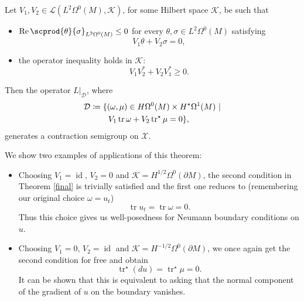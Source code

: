 \documentclass{ifacconf}
\newcommand{\tr}{\operatorname{tr}}
\newcommand{\Real}{\operatorname{Re}}
\newcommand{\drh}[2]{\Omega^{#2}(#1)}
\begin{document}
\begin{thm}\label{final}
    Let $V_1,V_2\in\mathcal{L}(L^2\drh{M}{0},\mathcal{K})$, for some Hilbert space $\mathcal{K}$, be such that
    \begin{itemize}
        \item $\Real\scprod{\theta}{\sigma}_{L^2\drh{M}{0}}\leq 0$ for every $\theta,\sigma\in L^2\drh{M}{0}$ satisfying
        \[
            V_1\theta+V_2\sigma=0,
        \]
        \item the operator inequality holds in $\mathcal{K}$:
        \[ 
            V_1V_2^*+V_2V_1^*\geq0.
        \]
    \end{itemize}
    Then the operator $L|_{\mathcal{D}}$, where
    \begin{align*}
        \MoveEqLeft
        \mathcal{D}\coloneqq \{ (\omega,\mu)\in H\drh{M}{0}\times H^{\star}\drh{M}{1}\ |\\
        &\quad  V_1\tr\omega+V_2\tr^{\star}\mu =0\},
    \end{align*}
    generates a contraction semigroup on $\mathcal{X}$.
\end{thm}
We show two examples of applications of this theorem:
\begin{itemize}
    \item Choosing $V_1=\operatorname{id}$, $V_2=0$ and $\mathcal{K}=H^{1/2}\drh{\partial M}{0}$, the second condition in Theorem \ref{final} is trivially satisfied and the first one reduces to (remembering our original choice $\omega=u_t$)
    \[
        \tr u_t=\tr\omega=0.
    \]
    Thus this choice gives us well-posedness for Neumann boundary conditions on $u$.
    \item Choosing $V_1=0$, $V_2=\operatorname{id}$ and $\mathcal{K}=H^{-1/2}\drh{\partial M}{0}$, we once again get the second condition for free and obtain
    \[
        \tr^{\star}(du)=\tr^{\star}\mu=0.
    \]
    It can be shown that this is equivalent to asking that the normal component of the gradient of $u$ on the boundary vanishes.
\end{itemize}
\end{document}
